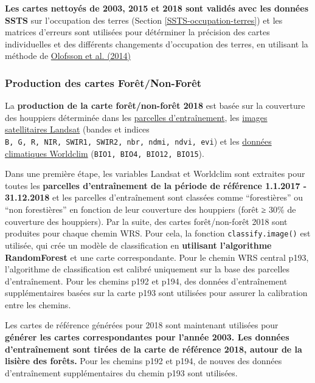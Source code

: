 \documentclass[a4paper, notitlepage, 12pt, krantz2]{krantz}
\begin{document}
\textbf{Les cartes nettoyés de 2003, 2015 et 2018 sont validés avec les données SSTS} sur l'occupation des terres (Section \ref{SSTS-occupation-terres}) et les matrices d'erreurs sont utilisées pour détérminer la précision des cartes individuelles et des différents changements d'occupation des terres, en utilisant la méthode de \href{https://www.sciencedirect.com/science/article/abs/pii/S0034425714000704}{Olofsson et al. (2014)}

\hypertarget{NRF-create-fc-maps}{%
\subsubsection{Production des cartes Forêt/Non-Forêt}\label{NRF-create-fc-maps}}

La \textbf{production de la carte forêt/non-forêt 2018} est basée sur la couverture des houppiers déterminée dans les \protect\hyperlink{SSTS-training-plots}{parcelles d'entraînement}, les \protect\hyperlink{SSTS-Landsat}{images satellitaires Landsat} (bandes et indices \texttt{B,\ G,\ R,\ NIR,\ SWIR1,\ SWIR2,\ nbr,\ ndmi,\ ndvi,\ evi}) et les \protect\hyperlink{SSTS-Worldclim}{données climatiques Worldclim} (\texttt{BIO1,\ BIO4,\ BIO12,\ BIO15}).

Dans une première étape, les variables Landsat et Worldclim sont extraites pour toutes les \textbf{parcelles d'entraînement de la période de référence 1.1.2017 - 31.12.2018} et les parcelles d'entraînement sont classées comme ``forestières'' ou ``non forestières'' en fonction de leur couverture des houppiers (forêt ≥ 30\% de couverture des houppiers). Par la suite, des cartes forêt/non-forêt 2018 sont produites pour chaque chemin WRS. Pour cela, la fonction \texttt{classify.image()} est utilisée, qui crée un modèle de classification en \textbf{utilisant l'algorithme RandomForest} et une carte correspondante. Pour le chemin WRS central p193, l'algorithme de classification est calibré uniquement sur la base des parcelles d'entraînement. Pour les chemins p192 et p194, des données d'entraînement supplémentaires basées sur la carte p193 sont utilisées pour assurer la calibration entre les chemins.

Les cartes de référence générées pour 2018 sont maintenant utilisées pour \textbf{générer les cartes correspondantes pour l'année 2003. Les données d'entraînement sont tirées de la carte de référence 2018, autour de la lisière des forêts.} Pour les chemins p192 et p194, de nouves des données d'entraînement supplémentaires du chemin p193 sont utilisées.
\end{document}
